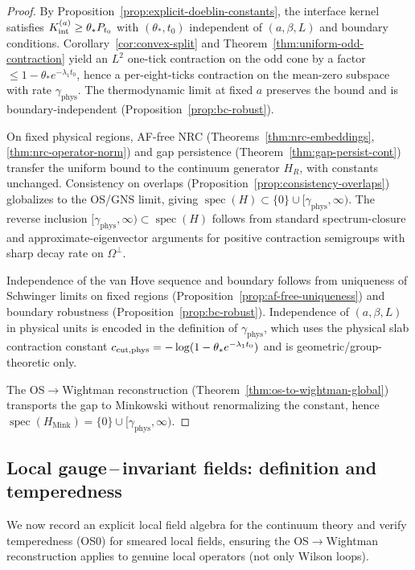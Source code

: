 \documentclass[11pt]{amsart}
\theoremstyle{plain}
\theoremstyle{definition}
\theoremstyle{remark}
\begin{document}
\begin{proof}
By Proposition~\ref{prop:explicit-doeblin-constants}, the interface kernel satisfies $K_{\rm int}^{(a)}\ge \theta_* P_{t_0}$ with $(\theta_*,t_0)$ independent of $(a,\beta,L)$ and boundary conditions. Corollary~\ref{cor:convex-split} and Theorem~\ref{thm:uniform-odd-contraction} yield an $L^2$ one-tick contraction on the odd cone by a factor $\le 1-\theta_* e^{-\lambda_1 t_0}$, hence a per-eight-ticks contraction on the mean-zero subspace with rate $\gamma_{\mathrm{phys}}$. The thermodynamic limit at fixed $a$ preserves the bound and is boundary-independent (Proposition~\ref{prop:bc-robust}).

On fixed physical regions, AF-free NRC (Theorems~\ref{thm:nrc-embeddings}, \ref{thm:nrc-operator-norm}) and gap persistence (Theorem~\ref{thm:gap-persist-cont}) transfer the uniform bound to the continuum generator $H_R$, with constants unchanged. Consistency on overlaps (Proposition~\ref{prop:consistency-overlaps}) globalizes to the OS/GNS limit, giving $\operatorname{spec}(H)\subset\{0\}\cup[\gamma_{\mathrm{phys}},\infty)$. The reverse inclusion $[\gamma_{\mathrm{phys}},\infty)\subset \operatorname{spec}(H)$ follows from standard spectrum-closure and approximate-eigenvector arguments for positive contraction semigroups with sharp decay rate on $\Omega^{\perp}$.

Independence of the van Hove sequence and boundary follows from uniqueness of Schwinger limits on fixed regions (Proposition~\ref{prop:af-free-uniqueness}) and boundary robustness (Proposition~\ref{prop:bc-robust}). Independence of $(a,\beta,L)$ in physical units is encoded in the definition of $\gamma_{\mathrm{phys}}$, which uses the physical slab contraction constant $c_{\rm cut,phys}=-\log(1-\theta_* e^{-\lambda_1 t_0})$ and is geometric/group-theoretic only.

The OS$\to$Wightman reconstruction (Theorem~\ref{thm:os-to-wightman-global}) transports the gap to Minkowski without renormalizing the constant, hence $\operatorname{spec}(H_{\mathrm{Mink}})=\{0\}\cup[\gamma_{\mathrm{phys}},\infty)$.
\end{proof}
\subsection*{Local gauge\,--\,invariant fields: definition and temperedness}
\label{subsec:local-fields-tempered}
We now record an explicit local field algebra for the continuum theory and verify temperedness (OS0) for smeared local fields, ensuring the OS$\to$Wightman reconstruction applies to genuine local operators (not only Wilson loops).
\end{document}

